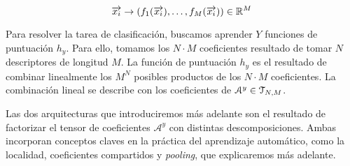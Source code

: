 \begin{equation}
	\overrightarrow{x_i} \to (f_1(\overrightarrow{x_i}), \ldots, f_M(\overrightarrow{x_i})) \in \mathbb{R}^M
\end{equation}

Para resolver la tarea de clasificación, buscamos aprender $Y$ funciones de puntuación $h_y$. Para ello, tomamos los $N \cdot M$ coeficientes resultado de tomar $N$ descriptores de longitud $M$. La función de puntuación $h_y$ es el resultado de combinar linealmente los $M^N$ posibles productos de los $N \cdot M$ coeficientes. La combinación lineal se describe con los coeficientes de $\mathcal{A}^y \in \mathcal{T}_{N, M}$.

Las dos arquitecturas que introduciremos más adelante son el resultado de factorizar el tensor de coeficientes $\mathcal{A}^y$ con distintas descomposiciones. Ambas incorporan conceptos claves en la práctica del aprendizaje automático, como la localidad, coeficientes compartidos y \textit{pooling}, que explicaremos más adelante.
